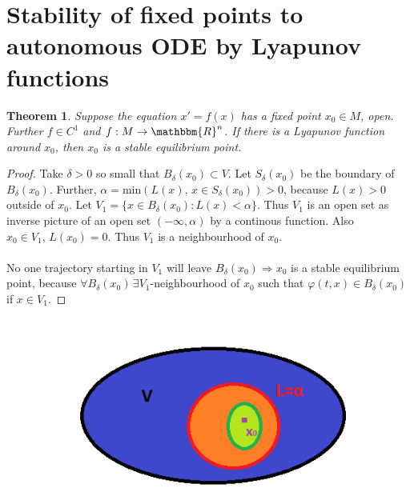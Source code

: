 \documentclass[12pt, a4paper]{article}
\newcommand{\R}{\ensuremath{\mathbbm{R}}}
\newtheorem{theorem}{Theorem}[section]
\begin{document}
\section{Stability of fixed points to autonomous ODE by Lyapunov functions}
\begin{theorem}
Suppose the equation $x'=f(x)$ has a fixed point $x_0\in M$, open. Further $f\in C^1$ and $f : M \to \R^n$. If there is a Lyapunov function around $x_0$, then $x_0$ is a stable equilibrium point.
\end{theorem}
\begin{proof}
Take $\delta >0$ so small that $B_\delta(x_0) \subset V$. Let $S_\delta(x_0)$ be the boundary of $B_\delta(x_0)$. Further, $\alpha = \text{min}(L(x),\, x\in S_\delta(x_0))>0$, because $L(x)>0$ outside of $x_0$. Let $V_1 = \{ x\in B_\delta(x_0) : L(x)<\alpha\}$. Thus $V_1$ is an open set as inverse picture of an open set $(-\infty,\alpha)$ by a continous function. Also $x_0\in V_1,\, L(x_0)=0$. Thus $V_1$ is a neighbourhood of $x_0$.
\\\\
No one trajectory starting in $V_1$ will leave $B_\delta(x_0) \Rightarrow x_0$ is a stable equilibrium point, because $\forall B_\delta(x_0)\, \exists V_1$-neighbourhood of $x_0$ such that $\varphi(t,x)\in B_\delta(x_0)$ if $x\in V_1$. 
\end{proof}
\begin{figure}[H]
\centering
\includegraphics[scale=0.7]{lyapunov.png}
\end{figure}
\end{document}
